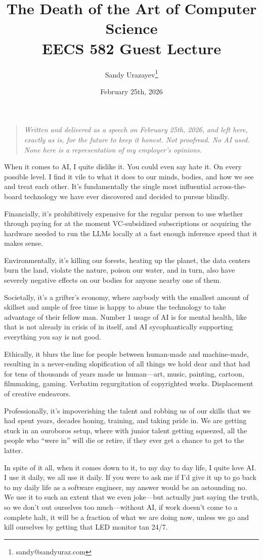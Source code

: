 \documentclass[12pt]{article}
\author{Sandy Urazayev\thanks{sandy@sandyuraz.com}}
\date{February 25th, 2026}
\title{The Death of the Art of Computer Science\\\medskip
\large EECS 582 Guest Lecture}
\begin{document}
\maketitle
\begin{quote}
\emph{Written and delivered as a speech on February 25th, 2026, and left here, exactly as
is, for the future to keep it honest. Not proofread. No AI used. None here is a
representation of my employer's opinions.}
\end{quote}

When it comes to AI, I quite dislike it. You could even say hate it. On every
possible level. I find it vile to what it does to our minds, bodies, and how we
see and treat each other. It's fundamentally the single most influential
across-the-board technology we have ever discovered and decided to pursue
blindly.

Financially, it's prohibitively expensive for the regular person to use whether
through paying  for at the moment VC-subsidized subscriptions or acquiring the
hardware needed to run the LLMs locally at a fast enough inference speed that it
makes sense.

Environmentally, it's killing our forests, heating up the planet, the data
centers burn the land, violate the nature, poison our water, and in turn, also
have severely negative effects on our bodies for anyone nearby one of them.

Societally, it's a grifter's economy, where anybody with the smallest amount of
skillset and ample of free time is happy to abuse the technology to take
advantage of their fellow man. Number 1 usage of AI is for mental health, like
that is not already in crisis of in itself, and AI sycophantically supporting
everything you say is not good.

Ethically, it blurs the line for people between human-made and machine-made,
resulting in a never-ending slopification of all things we hold dear and that
had for tens of thousands of years made us human---art, music, painting, cartoon,
filmmaking, gaming. Verbatim regurgitation of copyrighted works. Displacement of
creative endeavors.

Professionally, it's impoverishing the talent and robbing us of our skills that
we had spent years, decades honing, training, and taking pride in. We are
getting stuck in an ouroboros setup, where with junior talent getting squeezed,
all the people who ``were in'' will die or retire, if they ever get a chance to
get to the latter.

In spite of it all, when it comes down to it, to my day to day life, I quite
love AI. I use it daily, we all use it daily. If you were to ask me if I'd give
it up to go back to my daily life as a software engineer, my answer would be an
astounding no. We use it to such an extent that we even joke---but actually just
saying the truth, so we don't out ourselves too much---without AI, if work doesn't
come to a complete halt, it will be a fraction of what we are doing now, unless
we go and kill ourselves by getting that LED monitor tan 24/7.
\end{document}
